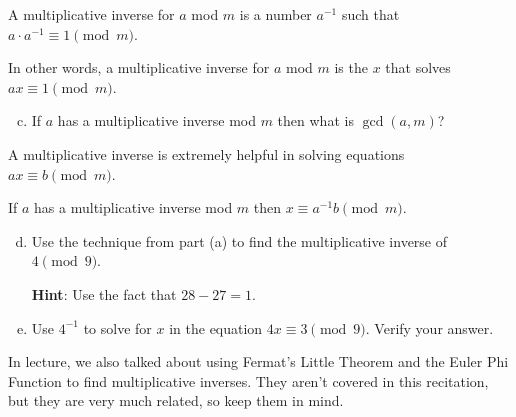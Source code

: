 \documentclass[12pt,letterpaper]{article}
\newcommand\hint[1]{\textbf{Hint}: #1}
\newif\ifsol
\newcommand{\solu}[2]{ \begin{mdframed} \ifsol #2 \else \vspace{#1} \fi \end{mdframed} }
\begin{document}
		A multiplicative inverse for $a$ mod $m$ is a number $a^{-1}$ such that $a \cdot a^{-1} \equiv 1 \pmod{m}$.

		In other words, a multiplicative inverse for $a$ mod $m$ is the $x$ that solves $ax \equiv 1 \pmod{m}$.

		\begin{enumerate}[a.]
		\setcounter{enumi}{2}
			\item If $a$ has a multiplicative inverse mod $m$ then what is $\gcd(a,m)$?
			\solu{1cm}{1}

		\end{enumerate}

		A multiplicative inverse is extremely helpful in solving equations $ax \equiv b \pmod{m}$.

		If $a$ has a multiplicative inverse mod ${m}$ then $x \equiv a^{-1}b \pmod{m}$.

		
		\begin{enumerate}[a.]
					\setcounter{enumi}{3}
			\item Use the technique from part (a) to find the multiplicative inverse of $4 \pmod 9$.

			\hint Use the fact that $28 - 27 = 1$.
			
			\solu{3cm}{
			$28-27 = 1 \implies 4 \cdot 7 + 9 \cdot (-3) = 1$, so $u=7$ and $v=-3$ \\
			Here, $k=1$ since $c$ and $d$ are both 1. \\
			Then $x = k \cdot u = 1 \cdot 7 = 7$ \\
			To verify, $4 \cdot 7 = 28$ and $9 | (1 - 28)$ \\
		    So, $4^{-1}=7$}

			\item Use $4^{-1}$ to solve for $x$ in the equation $4x \equiv 3 \pmod{9}$. Verify your answer.

			\solu{3cm}{
			We know $4 \cdot 7 \equiv 1 \pmod{9}$. Using what we proved in the warmup, $4 \cdot 7 \cdot 3 \equiv 3 \pmod{9}$, so $x = 7 \cdot 3 = 21$. \\
			$4 \cdot 21 = 84$, $3 - 84 = -81 = 9 \cdot (-9)$ so it is true $9 | (3 - 4 \cdot 21)$.
			}
			
		\end{enumerate}
		
		In lecture, we also talked about using Fermat's Little Theorem and the Euler Phi Function to find multiplicative inverses. They aren't covered in this recitation, but they are very much related, so keep them in mind.
\end{document}
